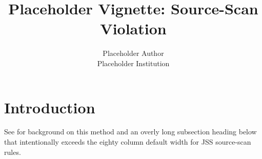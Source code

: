 \documentclass{jss}
\author{Placeholder Author\\Placeholder Institution}
\title{Placeholder Vignette: Source-Scan Violation}
\begin{document}
\section{Introduction}

See \cite{smith2020} for background on this method and an overly long subsection heading below that intentionally exceeds the eighty column default width for JSS source-scan rules.
\end{document}
